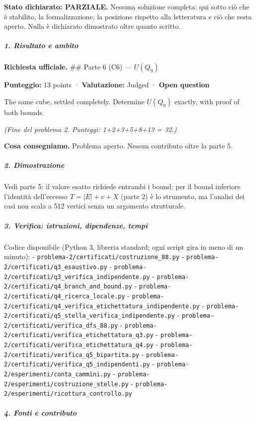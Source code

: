 \documentclass[11pt,a4paper]{article}
\begin{document}
\textbf{Stato dichiarato: PARZIALE.} Nessuna soluzione completa: qui
sotto ciò che è stabilito, la formalizzazione, la posizione rispetto
alla letteratura e ciò che resta aperto. Nulla è dichiarato dimostrato
oltre quanto scritto.

\subparagraph{1. Risultato e ambito}\label{risultato-e-ambito}

\textbf{Richiesta ufficiale.} \#\# Parte 6 (C6) --- \(U(Q_9)\)

\textbf{Punteggio:} 13 points · \textbf{Valutazione:} Judged ·
\textbf{Open question}

The same cube, settled completely. Determine \(U(Q_9)\) exactly, with
proof of both bounds.

\emph{(Fine del problema 2. Punteggi: 1+2+3+5+8+13 = 32.)}

\textbf{Cosa consegniamo.} Problema aperto. Nessun contributo oltre la
parte 5.

\subparagraph{2. Dimostrazione}\label{dimostrazione}

Vedi parte 5: il valore esatto richiede entrambi i bound; per il bound
inferiore l'identità dell'eccesso \(T=|E|+v+X\) (parte 2) è lo
strumento, ma l'analisi dei casi non scala a 512 vertici senza un
argomento strutturale.

\subparagraph{3. Verifica: istruzioni, dipendenze,
tempi}\label{verifica-istruzioni-dipendenze-tempi}

Codice disponibile (Python 3, libreria standard; ogni script gira in
meno di un minuto): - \texttt{problema-2/certificati/costruzione\_88.py}
- \texttt{problema-2/certificati/q3\_esaustivo.py} -
\texttt{problema-2/certificati/q3\_verifica\_indipendente.py} -
\texttt{problema-2/certificati/q4\_branch\_and\_bound.py} -
\texttt{problema-2/certificati/q4\_ricerca\_locale.py} -
\texttt{problema-2/certificati/q4\_verifica\_etichettatura\_indipendente.py}
- \texttt{problema-2/certificati/q5\_stella\_verifica\_indipendente.py}
- \texttt{problema-2/certificati/verifica\_dfs\_88.py} -
\texttt{problema-2/certificati/verifica\_etichettatura\_q3.py} -
\texttt{problema-2/certificati/verifica\_etichettatura\_q4.py} -
\texttt{problema-2/certificati/verifica\_q5\_bipartita.py} -
\texttt{problema-2/certificati/verifica\_q5\_indipendenti.py} -
\texttt{problema-2/esperimenti/conta\_cammini.py} -
\texttt{problema-2/esperimenti/costruzione\_stelle.py} -
\texttt{problema-2/esperimenti/ricottura\_controllo.py}

\subparagraph{4. Fonti e contributo}\label{fonti-e-contributo}
\end{document}
